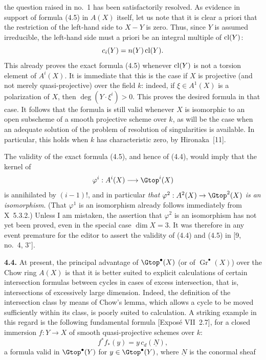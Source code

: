 the question raised in no.~1 has been satisfactorily resolved. As evidence
in support of formula (4.5) in $A(X)$ itself, let us note that it is clear a
priori that the restriction of the left-hand side to $X-Y$ is zero. Thus,
since $Y$ is assumed irreducible, the left-hand side must a priori be an
integral multiple of $\operatorname{cl}(Y)$:
\[
 c_i(Y)=n(Y)\operatorname{cl}(Y).
\]
This already proves the exact formula (4.5) whenever $\operatorname{cl}(Y)$ is not a
torsion element of $A^i(X)$. It is immediate that this is the case if $X$ is
projective (and not merely quasi-projective) over the field $k$: indeed, if
$\xi\in A^1(X)$ is a polarization of $X$, then
$\deg(Y\mathbin{\cdot}\xi^i)>0$. This proves the desired formula in that
case. It follows that the formula is still valid whenever $X$ is isomorphic
to an open subscheme of a smooth projective scheme over $k$, as will be the
case when an adequate solution of the problem of resolution of
singularities is available. In particular, this holds when $k$ has
characteristic zero, by Hironaka~[11].

The validity of the exact formula (4.5), and hence of (4.4), would imply that
the kernel of
\[
 \varphi^i:A^i(X)\longrightarrow\Gtop^i(X)
\]
is annihilated by $(i-1)!$, and in particular \emph{that
$\varphi^2:A^2(X)\to\Gtop^2(X)$ is an isomorphism}. (That $\varphi^1$ is an
isomorphism already follows immediately from X~5.3.2.) Unless I am
mistaken, the assertion that $\varphi^2$ is an isomorphism has not yet been
proved, even in the special case $\dim X=3$. It was therefore in any event
premature for the editor to assert the validity of (4.4) and (4.5) in
[9, no.~4, $3^\circ$].

\noindent\textbf{4.4.}
At present, the principal advantage of $\Gtop^\bullet(X)$ (or of
$\operatorname{Gr}^\bullet(X)$) over the Chow ring $A(X)$ is that it is
better suited to explicit calculations of certain intersection formulas
between cycles in cases of excess intersection, that is, intersections of
excessively large dimension. Indeed, the definition of the intersection
class by means of Chow's lemma, which allows a cycle to be moved sufficiently
within its class, is poorly suited to calculation. A striking example in
this regard is the following fundamental formula [Exposé VII~2.7], for a
closed immersion $f:Y\to X$ of smooth quasi-projective schemes over $k$:
\begin{equation*}\tag{4.6}
 f^*f_*(y)=y\,c_d(\underline{N}),
\end{equation*}
a formula valid in $\Gtop^\bullet(Y)$ for $y\in\Gtop^\bullet(Y)$, where
$\underline{N}$ is the conormal sheaf

